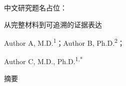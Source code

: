 \documentclass[UTF8,fontset=none,scheme=plain]{ctexart}
\renewcommand{\normalsize}{\fontsize{9.3bp}{12.4bp}\selectfont}\setlength{\parskip}{2bp}\setlength{\columnsep}{14bp}
\begin{document}
\normalsize\thispagestyle{opening}\vspace*{-8bp}
\noindent\hspace*{30.5bp}\begin{minipage}[t]{336bp}
\setlength{\fboxsep}{2bp}\setlength{\fboxrule}{.4bp}
\noindent{}\par\vspace{7bp}
{\centering\fontsize{17.5bp}{21bp}\selectfont 中文研究题名占位：\par 从完整材料到可追溯的证据表达\par}\vspace{6bp}
{\centering\sffamily\fontsize{8.7bp}{10.6bp}\selectfont\color{NEJMGrey}Author A, M.D.\textsuperscript{1}；Author B, Ph.D.\textsuperscript{2}；\par Author C, M.D., Ph.D.\textsuperscript{1,*}\par}\vspace{8bp}
\noindent\colorbox{NEJMCream}{\parbox{\dimexpr\linewidth-4bp}{\centering\fontsize{8bp}{10bp}\selectfont 摘\quad 要}}\par
\end{minipage}\par
\end{document}
